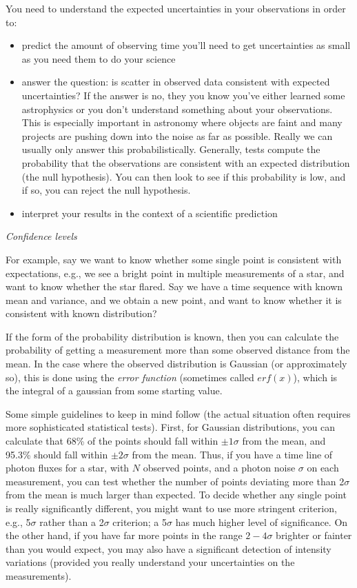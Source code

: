 \documentclass[12pt]{article}
\begin{document}
You need to understand the expected uncertainties in your
observations in order to:
\begin{itemize}
    \item predict the amount of observing time you'll need to get
    uncertainties as small as you need them to do your science
    \item answer the question: is scatter in observed data consistent
    with expected uncertainties? If the answer is no, they you know
    you've either learned some astrophysics or you don't understand
    something about your observations. This is especially important in
    astronomy where objects are faint and many projects are pushing
    down into the noise as far as possible. Really we can usually only
    answer this probabilistically. Generally, tests compute the
    probability that the observations are consistent with an expected
    distribution (the null hypothesis). You can then look to see if
    this probability is low, and if so, you can reject the null
    hypothesis.
    \item interpret your results in the context of a scientific
    prediction
\end{itemize}
\emph{Confidence levels}

For example, say we want to know whether some single point
is consistent with expectations, e.g., we see a bright point in
multiple measurements of a star, and want to know whether the star
flared. Say we have a time sequence with known mean and variance, and
we obtain a new point, and want to know whether it is consistent with
known distribution?

If the form of the probability distribution is known, then
you can calculate the probability of getting a measurement more than
some observed distance from the mean. In the case where the observed
distribution is Gaussian (or approximately so), this is done using the
\emph{error function} (sometimes called $erf(x)$), which is the integral of a
gaussian from some starting value.

Some simple guidelines to keep in mind follow (the actual
situation often requires more sophisticated statistical tests). First,
for Gaussian distributions, you can calculate that 68\% of the points
should fall within $\pm 1\sigma$ from the mean, and 95.3\%
should fall within $\pm 2\sigma$ from the mean. Thus, if you have a
time line of photon fluxes for a star, with $N$ observed points, and a
photon noise $\sigma$ on each measurement, you can test whether the
number of points deviating more than 2$\sigma$ from the mean is much
larger than expected. To decide whether any single point is really
significantly different, you might want to use more stringent
criterion, e.g., 5$\sigma$ rather than a 2$\sigma$ criterion;
a 5$\sigma$ has much higher level of significance. On the other hand, if
you have far more points in the range $2-4\sigma$ brighter or
fainter than you would expect, you may also have a significant
detection of intensity variations (provided you really understand your
uncertainties on the measurements).
\end{document}
